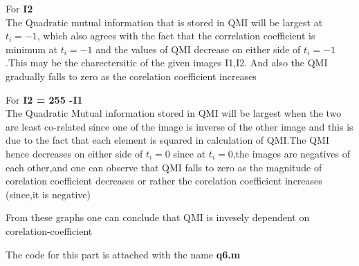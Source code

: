 \documentclass{article}
\begin{document}
    For \textbf{I2}\\
    The Quadratic mutual information that is stored in QMI will be largest at $t_i  = -1$, which also agrees with the fact that the correlation coefficient is minimum at $t_i = -1$ and the values of QMI decrease on either side of $t_i = -1$.This may be the charectersitic of the given images I1,I2. And also the QMI gradually falls to zero as the corelation coefficient increases\par 
    For \textbf{I2 = 255 -I1}\\
    The Quadratic Mutual information stored in QMI will be largest when the two are least co-related since one of the image is inverse of the other image and this is due to the fact that each element is squared in calculation of QMI.The QMI hence decreases on either side of $t_i = 0$ since at $t_i = 0$,the images are negatives of each other,and one can observe that QMI falls to zero as the magnitude of corelation coefficient decreases or rather the corelation coefficient increases (since,it is negative)\par 
    From these graphs one can conclude that QMI is invesely dependent on corelation-coefficient\par 
    The code for this part is attached with the name \textbf{q6.m}
\end{document}
